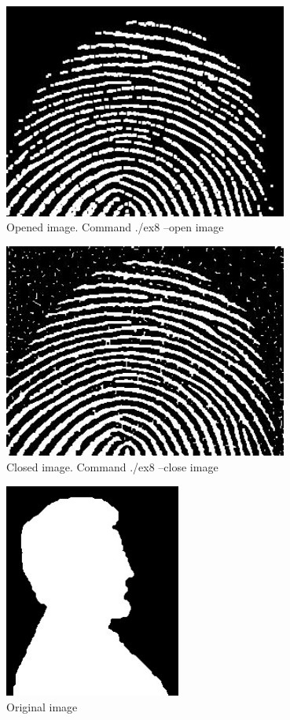 \documentclass[10pt]{article}
\begin{document}
\begin{figure}[!ht]
	\centering
	\includegraphics[height=200pt]{./ex8/noisy_opened.jpg}
	\caption{Opened image. Command ./ex8 --open image}
\end{figure}
\begin{figure}[!ht]
	\centering
	\includegraphics[height=200pt]{./ex8/noisy_closed.jpg}
	\caption{Closed image. Command ./ex8 --close image}
\end{figure}
\begin{figure}[!ht]
	\centering
	\includegraphics[height=200pt]{./ex8/lincoln.jpg}
	\caption{Original image}
\end{figure}
\end{document}
